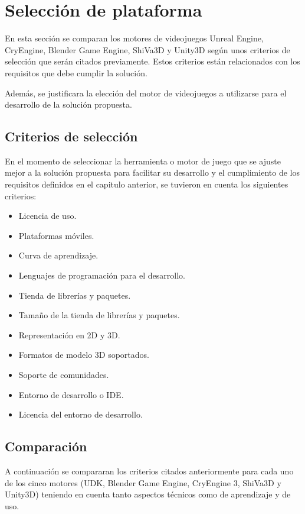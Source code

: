 \section{Selección de plataforma}
\label{sec:seleccion_plataforma}

En esta sección se comparan los motores de videojuegos Unreal Engine, CryEngine, Blender Game Engine, ShiVa3D y Unity3D según unos criterios de selección que serán citados previamente. Estos criterios están relacionados
con los requisitos que debe cumplir la solución.

Además, se justificara la elección del motor de videojuegos a utilizarse para el desarrollo de la solución propuesta.

\subsection{Criterios de selección}

En el momento de seleccionar la herramienta o motor de juego que se ajuste mejor
a la solución propuesta para facilitar su desarrollo y el cumplimiento de los
requisitos definidos en el capitulo anterior, se tuvieron en cuenta los
siguientes criterios:

\begin{itemize}
\item Licencia de uso.
\item Plataformas móviles.
\item Curva de aprendizaje.
\item Lenguajes de programación para el desarrollo.
\item Tienda de librerías y paquetes.
\item Tamaño de la tienda de librerías y paquetes.
\item Representación en 2D y 3D.
\item Formatos de modelo 3D soportados.
\item Soporte de comunidades.
\item Entorno de desarrollo o IDE.
\item Licencia del entorno de desarrollo.
\end{itemize}


\subsection{Comparación}

A continuación se compararan los criterios citados anteriormente para cada uno de los
cinco motores (UDK, Blender Game Engine, CryEngine 3, ShiVa3D y Unity3D) teniendo en cuenta tanto
aspectos técnicos como de aprendizaje y de uso.

